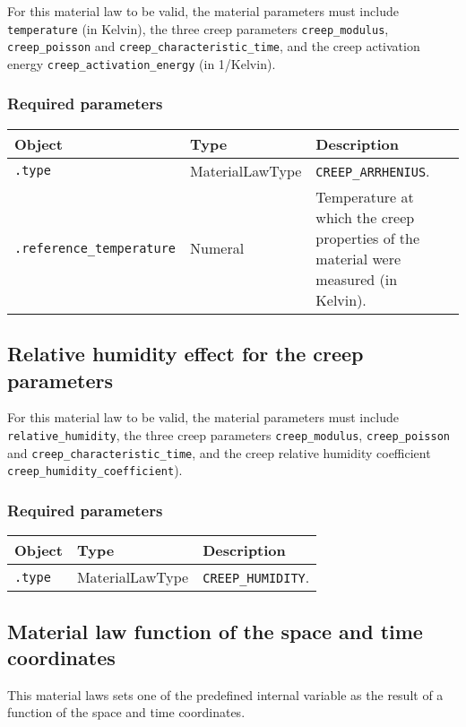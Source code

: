 \documentclass[10pt]{article}
\begin{document}
For this material law to be valid, the material parameters must include \verb+temperature+ (in Kelvin), the three creep parameters \verb+creep_modulus+, \verb+creep_poisson+ and \verb+creep_characteristic_time+, and the creep activation energy \verb+creep_activation_energy+ (in 1/Kelvin).

\subsubsection*{Required parameters}

\begin{tabularx}{\textwidth}{llX}
\hline 
Object & Type & Description \\ 
\hline 
\verb+.type+ & MaterialLawType & \verb+CREEP_ARRHENIUS+. \\ 
\verb+.reference_temperature+ & Numeral & Temperature at which the creep properties of the material were measured (in Kelvin). \\ 
\hline 
\end{tabularx}

\subsection{Relative humidity effect for the creep parameters}

For this material law to be valid, the material parameters must include \verb+relative_humidity+, the three creep parameters \verb+creep_modulus+, \verb+creep_poisson+ and \verb+creep_characteristic_time+, and the creep relative humidity coefficient \verb+creep_humidity_coefficient+).

\subsubsection*{Required parameters}

\begin{tabularx}{\textwidth}{llX}
\hline 
Object & Type & Description \\ 
\hline 
\verb+.type+ & MaterialLawType & \verb+CREEP_HUMIDITY+. \\ 
\hline 
\end{tabularx}

\subsection{Material law function of the space and time coordinates}

This material laws sets one of the predefined internal variable as the result of a function of the space and time coordinates.
\end{document}
